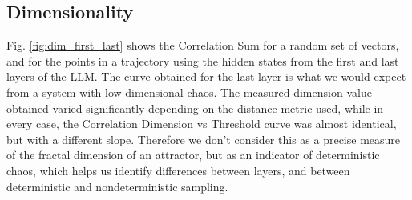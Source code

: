 \documentclass[a4paper,12pt]{article}
\begin{document}
    \subsection{Dimensionality}

    Fig. \ref{fig:dim_first_last} shows the Correlation Sum for a random set of vectors, and for the points in a trajectory using the hidden states from the first and last layers of the LLM. The curve obtained for the last layer is what we would expect from a system with low-dimensional chaos. The measured dimension value obtained varied significantly depending on the distance metric used, while in every case, the Correlation Dimension vs Threshold curve was almost identical, but with a different slope. Therefore we don't consider this as a precise measure of the fractal dimension of an attractor, but as an indicator of deterministic chaos, which helps us identify differences between layers, and between deterministic and nondeterministic sampling.
\end{document}
